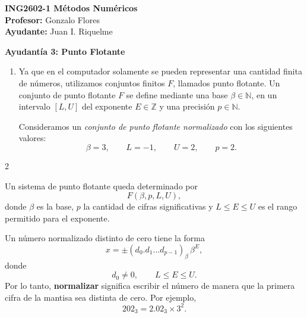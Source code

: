 \documentclass[letterpaper,12pt]{article}
\theoremstyle{plain}
\theoremstyle{definition}
\begin{document}
\def\Pauta{1}
	
	
	\begin{minipage}{11.5 cm}
         \vspace{-6mm}
		\begin{flushleft}
			\vspace{1mm}
			\textbf{ING2602-1  Métodos Numéricos}\\
			\textbf{Profesor:} Gonzalo Flores  \\
			\textbf{Ayudante:}  Juan I. Riquelme \\
		\end{flushleft}
	\end{minipage}
	
	\vspace{-6mm}
	\begin{center}
		\LARGE \bf{Ayudantía 3: Punto Flotante} %
	\end{center}
\begin{enumerate}

#Preguntas
\item Ya que en el computador solamente se pueden representar una cantidad finita de números, utilizamos conjuntos finitos $F$, llamados punto flotante. Un conjunto de punto flotante $F$ se define mediante una base $\beta \in \mathbb{N}$, en un intervalo $[L,U]$ del exponente $E \in \mathbb{Z}$ y una precisión $p \in \mathbb{N}$.

Consideramos un \textit{conjunto de punto flotante normalizado} con los siguientes valores:
\[
    \beta = 3,
    \qquad
    L = -1,
    \qquad
    U = 2,
    \qquad
    p = 2.
\]

\end{enumerate}



\begin{tcolorbox}[
    title = Resumen,
    colframe=cyan!80!black,
    colback=cyan!5!white,
    boxrule=0.8pt,
    arc=4pt,
    auto outer arc
]

\begin{multicols}{2}

Un sistema de punto flotante queda determinado por
\[
    F(\beta,p,L,U),
\]
donde $\beta$ es la base, $p$ la cantidad de cifras significativas y
$L\leq E\leq U$ es el rango permitido para el exponente.

Un número normalizado distinto de cero tiene la forma
\[
    x=\pm(d_0.d_1\ldots d_{p-1})_{\beta}\,\beta^E,
\]
donde
\[
    d_0\neq 0,
    \qquad
    L\leq E\leq U.
\]
Por lo tanto, \textbf{normalizar} significa escribir el número de manera
que la primera cifra de la mantisa sea distinta de cero. Por ejemplo,
\[
    202_3=2.02_3\times 3^2.
\]
\end{multicols}

\end{tcolorbox}
\end{document}

